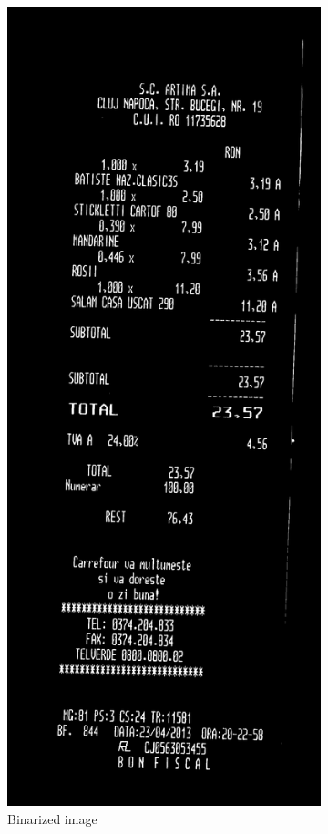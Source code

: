 \begin{figure}
\begin{subfigure}{0.49\linewidth}
  \includegraphics[width=.6\linewidth]{img/binarized.jpg}
  \caption{Binarized image}
  \label{fig:bin_image}
\end{subfigure}
\begin{subfigure}{0.49\linewidth}
  \centering

\end{subfigure}
\end{figure}
